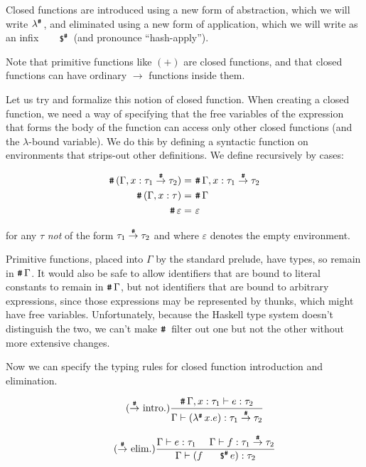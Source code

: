 \documentclass[preprint]{sigplanconf}
\begin{document}
Closed functions are introduced using a new form of abstraction, which we will write $\lambda^{\texttt{\#}}\,$, and eliminated using a new form of application, which we will write as an infix $\napp$ (and pronounce ``hash-apply'').

Note that primitive functions like $(+)$ are closed functions, and that closed functions can have ordinary $\rightarrow$ functions inside them.  

Let us try and formalize this notion of closed function.  
When creating a closed function, we need a way of specifying that the free variables of the expression that forms the body of the function can access only other closed functions (and the $\lambda$-bound variable).  We do this by defining a syntactic function \closed{} on environments that strips-out other definitions.  We define \closed{} recursively by cases:

\begin{align*}
	\texttt{\#}\,(\Gamma , x: \tau_1 \stackrel{\texttt{\#}}{\rightarrow} \tau_2) 		=& ~ \texttt{\#}\,\Gamma , x: \tau_1 \stackrel{\texttt{\#}}{\rightarrow} \tau_2 \\
	\texttt{\#}\,(\Gamma , x: \tau)						=& ~ \texttt{\#}\,\Gamma   \\
	\texttt{\#}\,\varepsilon 								=& ~ \varepsilon 
\end{align*}

for any $\tau$ \emph{not} of the form $\tau_1 \stackrel{\texttt{\#}}{\rightarrow}{} \tau_2$ and
where $\varepsilon$ denotes the empty environment.

Primitive functions, placed into $\Gamma$ by the standard prelude, have \nfn{} types, so remain in $\texttt{\#}\,\Gamma$.
It would also be safe to allow identifiers that are bound to literal constants to remain in $\texttt{\#}\,\Gamma$, but not  identifiers that are bound to
arbitrary expressions, since those expressions may be represented by thunks, which might have free variables.  Unfortunately, because the Haskell type system doesn't distinguish the two, we can't make $\closed$ filter out one but not the other without more extensive changes.

Now we can specify the typing rules for closed function introduction and elimination. 

\begin{equation*}
\tag{\nfn~intro.}
\frac{\closed{\Gamma}, x : \tau_1 \entails e : \tau_2}
		{\Gamma \entails (\nlambda x.e) : \tau_1 \nfn \tau_2}
\end{equation*}


\begin{equation*}
\tag{\nfn~elim.}
\frac{\Gamma \entails e : \tau_1 ~~~~ \Gamma \entails f : \tau_1  \nfn \tau_2}
		{\Gamma \entails (f \napp e) : \tau_2}
\end{equation*}
\end{document}
